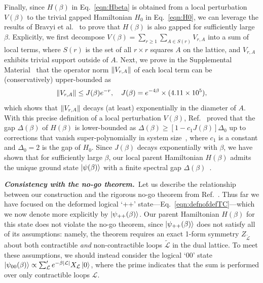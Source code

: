 \documentclass[aps,prl,twocolumn,floatfix,nofootinbib]{revtex4-2}
\theoremstyle{definition}
\begin{document}
Finally, since $H(\beta)$ in Eq.~\eqref{eqn:Hbeta} is obtained from a local perturbation $V(\beta)$ to the trivial gapped Hamiltonian $H_{0}$ in Eq.~\eqref{eqn:H0}, we can leverage the results of Bravyi et al.~\cite{BravyiHastingsMichalakis2010,BravyiHastings2011} to prove that $H(\beta)$ is also gapped for sufficiently large $\beta$. Explicitly, we first decompose $V(\beta) = \sum_{r \geq 1} \sum_{A \in S(r)} V_{r,A}$ into a sum of local terms, where $S(r)$ is the set of all $r \times r$ squares $A$ on the lattice, and $V_{r,A}$ exhibits trivial support outside of $A$. Next, we prove in the Supplemental Material~\cite{SOM} that the operator norm $\norm{V_{r,A}}$ of each local term can be (conservatively) upper-bounded as
\begin{equation}
\label{eq:VrA}
\norm{V_{r,A}} \leq J(\beta) e^{-r}, \quad J(\beta) = e^{-4 \beta} \times (4.11 \times 10^5) ,
\end{equation}
which shows that $\norm{V_{r,A}}$ decays (at least) exponentially in the diameter of $A$. With this precise definition of a local perturbation $V(\beta)$, Ref.~ proved that the gap $\Delta(\beta)$ of $H(\beta)$ is lower-bounded as $\Delta(\beta) \geq [1 - c_{1} J(\beta)] \Delta_{0}$ up to corrections that vanish super-polynomially in system size~\cite{fn2}, where $c_{1}$ is a constant and $\Delta_{0} = 2$ is the gap of $H_{0}$. Since $J(\beta)$ decays exponentially with $\beta$, we have shown that for sufficiently large $\beta$, our local parent Hamiltonian $H(\beta)$ admits the unique ground state $\ket{\psi(\beta)}$ with a finite spectral gap $\Delta(\beta)$~\cite{fn3}. 



\textbf{\textit{Consistency with the no-go theorem.}}~Let us describe the relationship between our construction and the rigorous no-go theorem from Ref.~. Thus far we have focused on the deformed logical `++' state---Eq.~\eqref{eqn:defnofdefTC}---which we now denote more explicitly by $\ket{\psi_{++}(\beta)}$. Our parent Hamiltonian $H(\beta)$ for this state does not violate the no-go theorem, since $\ket{\psi_{++}(\beta)}$ does not satisfy all of its assumptions: namely, the theorem requires an exact 1-form symmetry $Z_{\tilde{\mathcal{L}}}$ about both contractible \emph{and} non-contractible loops $\tilde{\mathcal{L}}$ in the dual lattice. To meet these assumptions, we should instead consider the logical `00' state $\ket{\psi_{00}(\beta)} \propto \sum_{\mathcal{L}}' e^{-\beta \abs{\mathcal{L}}} X_{\mathcal{L}} \ket{0}$, where the prime indicates that the sum is performed over only contractible loops $\mathcal{L}$. 
\end{document}

